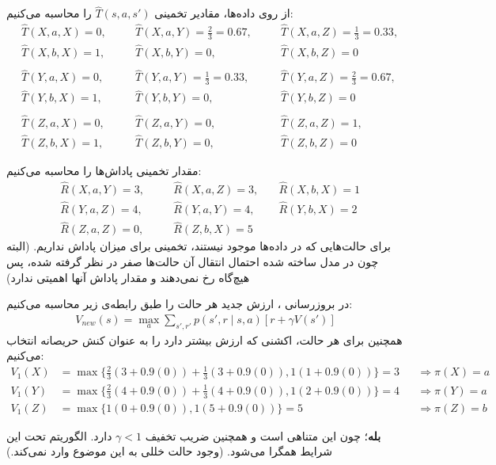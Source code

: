 \question{}

\begin{ابجد}
\item از روی داده‌ها، مقادیر تخمینی $\hat{T}(s, a, s')$ را محاسبه می‌کنیم:
\begin{align*}
     & \hat{T}(X, a, X) = 0, \quad &  & \hat{T}(X, a, Y) = \frac{2}{3} = 0.67, \quad &  & \hat{T}(X, a, Z) = \frac{1}{3} = 0.33, \\
     & \hat{T}(X, b, X) = 1, \quad &  & \hat{T}(X, b, Y) = 0, \quad                  &  & \hat{T}(X, b, Z) = 0                   \\
    \\
     & \hat{T}(Y, a, X) = 0, \quad &  & \hat{T}(Y, a, Y) = \frac{1}{3} = 0.33, \quad &  & \hat{T}(Y, a, Z) = \frac{2}{3} = 0.67, \\
     & \hat{T}(Y, b, X) = 1, \quad &  & \hat{T}(Y, b, Y) = 0, \quad                  &  & \hat{T}(Y, b, Z) = 0                   \\
    \\
     & \hat{T}(Z, a, X) = 0, \quad &  & \hat{T}(Z, a, Y) = 0, \quad                  &  & \hat{T}(Z, a, Z) = 1,                  \\
     & \hat{T}(Z, b, X) = 1, \quad &  & \hat{T}(Z, b, Y) = 0, \quad                  &  & \hat{T}(Z, b, Z) = 0
\end{align*}

\item مقدار تخمینی پاداش‌ها را محاسبه می‌کنیم:
\begin{align*}
     & \hat{R}(X, a, Y) = 3, \quad &  & \hat{R}(X, a, Z) = 3, \quad & \hat{R}(X, b, X) = 1 \\
     & \hat{R}(Y, a, Z) = 4, \quad &  & \hat{R}(Y, a, Y) = 4, \quad & \hat{R}(Y, b, X) = 2 \\
     & \hat{R}(Z, a, Z) = 0, \quad &  & \hat{R}(Z, b, X) = 5
\end{align*}
برای حالت‌هایی که در داده‌ها موجود نیستند، تخمینی برای میزان پاداش نداریم. (البته چون در مدل ساخته شده احتمال انتقال آن حالت‌ها صفر در نظر گرفته شده، پس هیچ‌گاه رخ نمی‌دهند و مقدار پاداش آنها اهمیتی ندارد)

\item در بروزرسانی ، ارزش جدید هر حالت را طبق رابطه‌ی زیر محاسبه می‌کنیم:
\begin{align*}
    V_{new}(s) = \max_a \sum_{s', r'} p(s', r \mid s,a) [r + \gamma V(s')]
\end{align*}
همچنین برای هر حالت، اکشنی که ارزش بیشتر دارد را به عنوان کنش حریصانه انتخاب می‌کنیم:
\begin{align*}
    V_{1}(X) & = \max \{ \frac{2}{3}(3 + 0.9(0)) + \frac{1}{3}(3 + 0.9(0)), 1(1 + 0.9(0)) \} = 3 &  & \Rightarrow \pi(X) = a \\[1em]
    V_{1}(Y) & = \max \{ \frac{2}{3}(4 + 0.9(0)) + \frac{1}{3}(4 + 0.9(0)), 1(2 + 0.9(0)) \} = 4 &  & \Rightarrow \pi(Y) = a \\[1em]
    V_{1}(Z) & = \max \{ 1(0 + 0.9(0)), 1(5 + 0.9(0)) \} = 5                                     &  & \Rightarrow \pi(Z) = b
\end{align*}

\item \textbf{بله}؛ چون این  متناهی است و همچنین ضریب تخفیف $\gamma < 1$ دارد. الگوریتم  تحت این شرایط همگرا می‌شود. (وجود حالت  خللی به این موضوع وارد نمی‌کند.)

\end{ابجد}